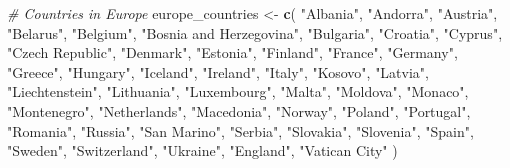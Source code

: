 \documentclass[
]{article}
\newenvironment{Shaded}{\begin{snugshade}}{\end{snugshade}}
\newcommand{\CommentTok}[1]{\textcolor[rgb]{0.56,0.35,0.01}{\textit{#1}}}
\newcommand{\FunctionTok}[1]{\textcolor[rgb]{0.13,0.29,0.53}{\textbf{#1}}}
\newcommand{\NormalTok}[1]{#1}
\newcommand{\OtherTok}[1]{\textcolor[rgb]{0.56,0.35,0.01}{#1}}
\newcommand{\StringTok}[1]{\textcolor[rgb]{0.31,0.60,0.02}{#1}}
\begin{document}
\begin{Shaded}
\begin{Highlighting}[]
\CommentTok{\# Countries in Europe}
\NormalTok{europe\_countries }\OtherTok{\textless{}{-}} \FunctionTok{c}\NormalTok{(}
  \StringTok{"Albania"}\NormalTok{, }\StringTok{"Andorra"}\NormalTok{, }\StringTok{"Austria"}\NormalTok{, }\StringTok{"Belarus"}\NormalTok{, }\StringTok{"Belgium"}\NormalTok{, }
  \StringTok{"Bosnia and Herzegovina"}\NormalTok{, }\StringTok{"Bulgaria"}\NormalTok{, }\StringTok{"Croatia"}\NormalTok{, }\StringTok{"Cyprus"}\NormalTok{, }
  \StringTok{"Czech Republic"}\NormalTok{, }\StringTok{"Denmark"}\NormalTok{, }\StringTok{"Estonia"}\NormalTok{, }\StringTok{"Finland"}\NormalTok{, }\StringTok{"France"}\NormalTok{, }
  \StringTok{"Germany"}\NormalTok{, }\StringTok{"Greece"}\NormalTok{, }\StringTok{"Hungary"}\NormalTok{, }\StringTok{"Iceland"}\NormalTok{, }\StringTok{"Ireland"}\NormalTok{, }\StringTok{"Italy"}\NormalTok{, }
  \StringTok{"Kosovo"}\NormalTok{, }\StringTok{"Latvia"}\NormalTok{, }\StringTok{"Liechtenstein"}\NormalTok{, }\StringTok{"Lithuania"}\NormalTok{, }\StringTok{"Luxembourg"}\NormalTok{, }
  \StringTok{"Malta"}\NormalTok{, }\StringTok{"Moldova"}\NormalTok{, }\StringTok{"Monaco"}\NormalTok{, }\StringTok{"Montenegro"}\NormalTok{, }\StringTok{"Netherlands"}\NormalTok{, }
  \StringTok{"Macedonia"}\NormalTok{, }\StringTok{"Norway"}\NormalTok{, }\StringTok{"Poland"}\NormalTok{, }\StringTok{"Portugal"}\NormalTok{, }\StringTok{"Romania"}\NormalTok{, }
  \StringTok{"Russia"}\NormalTok{, }\StringTok{"San Marino"}\NormalTok{, }\StringTok{"Serbia"}\NormalTok{, }\StringTok{"Slovakia"}\NormalTok{, }\StringTok{"Slovenia"}\NormalTok{, }
  \StringTok{"Spain"}\NormalTok{, }\StringTok{"Sweden"}\NormalTok{, }\StringTok{"Switzerland"}\NormalTok{, }\StringTok{"Ukraine"}\NormalTok{, }\StringTok{"England"}\NormalTok{, }
  \StringTok{"Vatican City"}
\NormalTok{)}


\end{Highlighting}
\end{Shaded}
\end{document}
